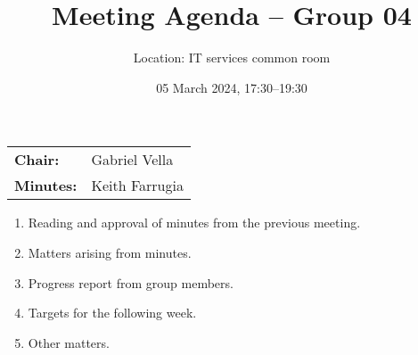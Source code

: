 \documentclass{cce2014-meetings}
\title{Meeting Agenda -- Group 04}
\author{Location: IT services common room}
\date{05 March 2024, 17:30--19:30}
\begin{document}
\maketitle
\begin{center}
        \begin{tabular}{ll}
                \textbf{Chair:}   & Gabriel Vella  \\
                \textbf{Minutes:} & Keith Farrugia
        \end{tabular}
\end{center}

\begin{enumerate}

        \item Reading and approval of minutes from the previous meeting.

        \item Matters arising from minutes.

        \item Progress report from group members.

        \item Targets for the following week.

        \item Other matters.

\end{enumerate}
\end{document}

